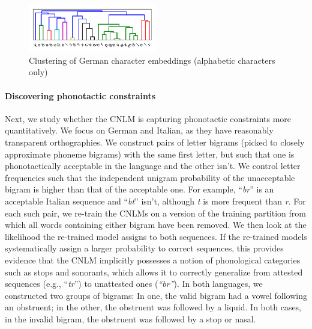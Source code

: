 \begin{figure}
\includegraphics[width=0.50\textwidth]{figures/char-emb-clustering-output_output-phonetic-wiki-german-nospaces-bptt-910515909.pdf}
\caption{Clustering of German character embeddings (alphabetic characters only)}\label{fig:char-clustering}
\end{figure}



\paragraph{Discovering phonotactic constraints}
\label{sec:phonotactics}

Next, we study whether the CNLM is capturing phonotactic constraints
more quantitatively.  We focus on German and Italian, as they
have reasonably transparent orthographies.  We construct pairs of
letter bigrams (picked to closely approximate phoneme bigrams) with
the same first letter, but such that one is phonotactically acceptable
in the language and the other isn't. We control letter frequencies
such that the independent unigram probability of the unacceptable
bigram is higher than that of the acceptable one. For example,
``\emph{br}'' is an acceptable Italian sequence and ``\emph{bt}''
isn't, although \emph{t} is more frequent than \emph{r}.  For each
such pair, we re-train the CNLMs on a version of the training partition
from which all words containing either bigram have been removed.  We
then look at the likelihood the re-trained model assigns to both sequences. If
the re-trained models systematically assign a larger probability to correct
sequences, this provides evidence that the CNLM implicitly possesses a
notion of phonological categories such as stops and sonorants, which
allows it to correctly generalize from attested sequences (e.g.,
``\emph{tr}'') to unattested ones (\emph{``br''}). In both languages,
we constructed two groups of bigrams: In one, the valid bigram had a
vowel following an obstruent; in the other, the obstruent was followed by
a liquid.  In both cases, in the invalid bigram, the obstruent was followed by a
stop or nasal.  %

